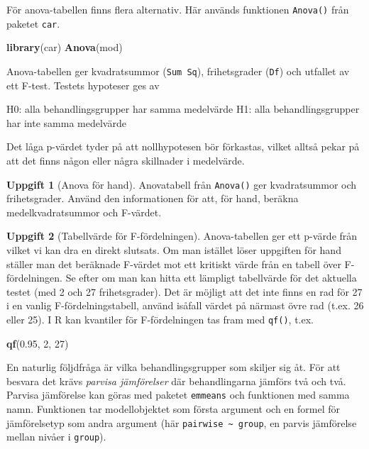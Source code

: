 \documentclass[
]{book}
\newenvironment{Shaded}{\begin{snugshade}}{\end{snugshade}}
\newcommand{\DecValTok}[1]{\textcolor[rgb]{0.00,0.00,0.81}{#1}}
\newcommand{\FloatTok}[1]{\textcolor[rgb]{0.00,0.00,0.81}{#1}}
\newcommand{\FunctionTok}[1]{\textcolor[rgb]{0.13,0.29,0.53}{\textbf{#1}}}
\newcommand{\NormalTok}[1]{#1}
\theoremstyle{definition}
\theoremstyle{definition}
\theoremstyle{definition}
\newtheorem{exercise}{Uppgift}[chapter]
\theoremstyle{definition}
\theoremstyle{remark}
\begin{document}
För anova-tabellen finns flera alternativ. Här används funktionen \texttt{Anova()} från paketet \texttt{car}.

\begin{Shaded}
\begin{Highlighting}[]
\FunctionTok{library}\NormalTok{(car)}
\FunctionTok{Anova}\NormalTok{(mod)}
\end{Highlighting}
\end{Shaded}

Anova-tabellen ger kvadratsummor (\texttt{Sum\ Sq}), frihetsgrader (\texttt{Df}) och utfallet av ett F-test. Testets hypoteser ges av

H0: alla behandlingsgrupper har samma medelvärde
H1: alla behandlingsgrupper har inte samma medelvärde

Det låga p-värdet tyder på att nollhypotesen bör förkastas, vilket alltså pekar på att det finns någon eller några skillnader i medelvärde.

\begin{exercise}[Anova för hand]
Anovatabell från \texttt{Anova()} ger kvadratsummor och frihetsgrader. Använd den informationen för att, för hand, beräkna medelkvadratsummor och F-värdet.
\end{exercise}

\begin{exercise}[Tabellvärde för F-fördelningen]

Anova-tabellen ger ett p-värde från vilket vi kan dra en direkt slutsats. Om man istället löser uppgiften för hand ställer man det beräknade F-värdet mot ett kritiskt värde från en tabell över F-fördelningen. Se efter om man kan hitta ett lämpligt tabellvärde för det aktuella testet (med 2 och 27 frihetsgrader). Det är möjligt att det inte finns en rad för 27 i en vanlig F-fördelningstabell, använd isåfall värdet på närmast övre rad (t.ex. 26 eller 25). I R kan kvantiler för F-fördelningen tas fram med \texttt{qf()}, t.ex.

\begin{Shaded}
\begin{Highlighting}[]
\FunctionTok{qf}\NormalTok{(}\FloatTok{0.95}\NormalTok{, }\DecValTok{2}\NormalTok{, }\DecValTok{27}\NormalTok{)}
\end{Highlighting}
\end{Shaded}

\end{exercise}

En naturlig följdfråga är vilka behandlingsgrupper som skiljer sig åt. För att besvara det krävs \emph{parvisa jämförelser} där behandlingarna jämförs två och två. Parvisa jämförelse kan göras med paketet \texttt{emmeans} och funktionen med samma namn. Funktionen tar modellobjektet som första argument och en formel för jämförelsetyp som andra argument (här \texttt{pairwise\ \textasciitilde{}\ group}, en parvis jämförelse mellan nivåer i \texttt{group}).
\end{document}
